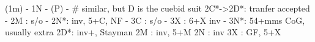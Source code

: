 (1m) - 1N - (P) - 
# similar, but D is the cuebid suit
2C*->2D*: tranfer accepted
        - 2M : s/o
        - 2N*: inv, 5+C, NF
        - 3C : s/o
        - 3X : 6+X inv
        - 3N*: 54+mms CoG, usually extra
2D*: inv+, Stayman
2M : inv, 5+M
2N : inv
3X : GF, 5+X